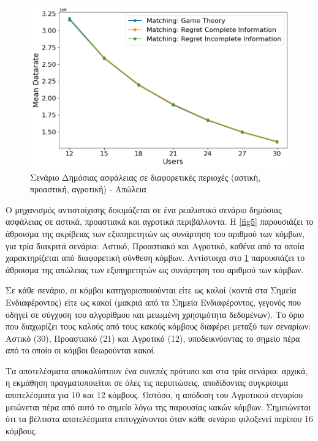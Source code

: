 \begin{figure}[H]
    \centering
    \includegraphics[width=\textwidth]{figures/chapter4/Mean_Datarate_vs_Users.png}
    \caption{Σενάριο Δημόσιας ασφάλειας σε διαφορετικές περιοχές (αστική, προαστική, αγροτική) - Απώλεια}
    \label{fig6}
\end{figure}

\newpage

Ο μηχανισμός αντιστοίχισης δοκιμάζεται σε ένα ρεαλιστικό σενάριο δημόσιας ασφάλειας σε αστικά, προαστιακά και αγροτικά περιβάλλοντα. Η \ref{fig5} παρουσιάζει το άθροισμα της ακρίβειας των εξυπηρετητών ως συνάρτηση του αριθμού των κόμβων, για τρία διακριτά σενάρια: Αστικό, Προαστιακό και Αγροτικό, καθένα από τα οποία χαρακτηρίζεται από διαφορετική σύνθεση κόμβων. Αντίστοιχα στο \ref{fig6} παρουσιάζει το άθροισμα της απώλειας των εξυπηρετητών ως συνάρτηση του αριθμού των κόμβων.

Σε κάθε σενάριο, οι κόμβοι κατηγοριοποιούνται είτε ως καλοί (κοντά στα Σημεία Ενδιαφέροντος) είτε ως κακοί (μακριά από τα Σημεία Ενδιαφέροντος, γεγονός που οδηγεί σε σύγχυση του αλγορίθμου και μειωμένη χρησιμότητα δεδομένων). Το όριο που διαχωρίζει τους καλούς από τους κακούς κόμβους διαφέρει μεταξύ των σεναρίων: Αστικό (30), Προαστιακό (21) και Αγροτικό (12), υποδεικνύοντας το σημείο πέρα από το οποίο οι κόμβοι θεωρούνται κακοί.

Τα αποτελέσματα αποκαλύπτουν ένα συνεπές πρότυπο και στα τρία σενάρια: αρχικά, η εκμάθηση πραγματοποιείται σε όλες τις περιπτώσεις, αποδίδοντας συγκρίσιμα αποτελέσματα για 10 και 12 κόμβους. Ωστόσο, η απόδοση του Αγροτικού σεναρίου μειώνεται πέρα από αυτό το σημείο λόγω της παρουσίας κακών κόμβων. Σημειώνεται ότι τα βέλτιστα αποτελέσματα επιτυγχάνονται όταν κάθε σενάριο φιλοξενεί περίπου 16 κόμβους.

